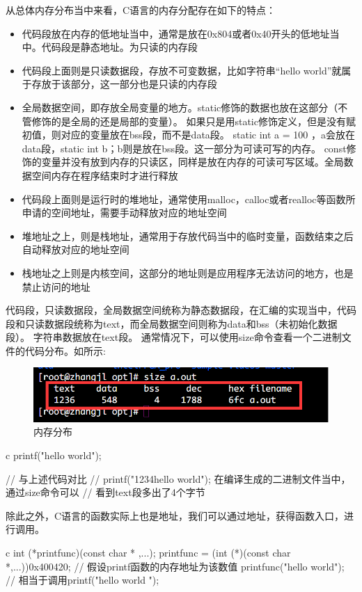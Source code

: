 从总体内存分布当中来看，C语言的内存分配存在如下的特点：
\begin{itemize}
  \item 代码段放在内存的低地址当中，通常是放在0x804或者0x40开头的低地址当中。代码段是静态地址。为只读的内存段
  \item 代码段上面则是只读数据段，存放不可变数据，比如字符串“hello world”就属于存放于该部分，这一部分也是只读的内存段
  \item 全局数据空间，即存放全局变量的地方。static修饰的数据也放在这部分（不管修饰的是全局的还是局部的变量）。
    如果只是用static修饰定义，但是没有赋初值，则对应的变量放在bss段，而不是data段。
    static int a = 100 ，a会放在data段，static int b；b则是放在bss段。这一部分为可读可写的内存。
    const修饰的变量并没有放到内存的只读区，同样是放在内存的可读可写区域。全局数据空间内存在程序结束时才进行释放
  \item 代码段上面则是运行时的堆地址，通常使用malloc，calloc或者realloc等函数所申请的空间地址，需要手动释放对应的地址空间
  \item 堆地址之上，则是栈地址，通常用于存放代码当中的临时变量，函数结束之后自动释放对应的地址空间
  \item 栈地址之上则是内核空间，这部分的地址则是应用程序无法访问的地方，也是禁止访问的地址
\end{itemize}

代码段，只读数据段，全局数据空间统称为静态数据段，在汇编的实现当中，代码段和只读数据段统称为text，而全局数据空间则称为data和bss（未初始化数据段）。
字符串数据放在text段。
通常情况下，可以使用size命令查看一个二进制文件的代码分布。如所示:
\begin{figure}[H]
  \centering
  \includegraphics[width=\linewidth]{size.png}
  \caption{内存分布}
  \label{fig:size}
\end{figure}

\begin{code-block}{c}
printf("hello world\n");

// 与上述代码对比
// printf("1234hello world\n"); 在编译生成的二进制文件当中，通过size命令可以
// 看到text段多出了4个字节
\end{code-block}

除此之外，C语言的函数实际上也是地址，我们可以通过地址，获得函数入口，进行调用。
\begin{code-block}{c}
int (*printfunc)(const char * ,...);
printfunc = (int (*)(const char *,...))0x400420; // 假设printf函数的内存地址为该数值
printfunc("hello world\n"); // 相当于调用printf("hello world \n");
\end{code-block}

